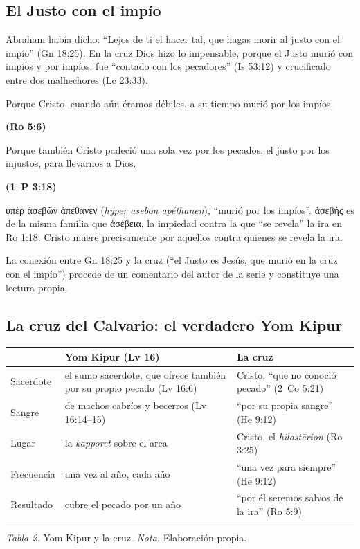 \documentclass[11pt,letterpaper]{article}
\newcommand{\grc}[1]{\foreignlanguage{ancientgreek}{#1}}
\newcommand{\fuente}[1]{\par\hfill{\upshape\bfseries\small\textcolor{azul}{#1}}}
\begin{document}
\subsection{El Justo con el impío}
Abraham había dicho: ``Lejos de ti el hacer tal, que hagas morir al justo con el impío'' (Gn 18:25). En la cruz Dios hizo lo impensable, porque el Justo murió con impíos y por impíos: fue ``contado con los pecadores'' (Is 53:12) y crucificado entre dos malhechores (Lc 23:33).

\begin{cita}Porque Cristo, cuando aún éramos débiles, a su tiempo murió por los impíos.\fuente{(Ro 5:6)}\end{cita}

\begin{cita}Porque también Cristo padeció una sola vez por los pecados, el justo por los injustos, para llevarnos a Dios.\fuente{(1~P 3:18)}\end{cita}

\begin{filologia}[Ro 5:6]
\grc{ὑπὲρ ἀσεβῶν ἀπέθανεν} (\emph{hyper asebōn apéthanen}), ``murió por los impíos''. \grc{ἀσεβής} es de la misma familia que \grc{ἀσέβεια}, la impiedad contra la que ``se revela'' la ira en Ro 1:18. Cristo muere precisamente por aquellos contra quienes se revela la ira.
\end{filologia}

\begin{nota}[Precisión]
La conexión entre Gn 18:25 y la cruz (``el Justo es Jesús, que murió en la cruz con el impío'') procede de un comentario del autor de la serie y constituye una lectura propia.
\end{nota}

\subsection{La cruz del Calvario: el verdadero Yom Kipur}
\begin{center}\small\renewcommand{\arraystretch}{1.3}
\begin{tabular}{@{}L{2.6cm}L{5.6cm}L{6.2cm}@{}}
\toprule
& \textbf{Yom Kipur (Lv 16)} & \textbf{La cruz} \\ \midrule
Sacerdote & el sumo sacerdote, que ofrece también por su propio pecado (Lv 16:6) & Cristo, ``que no conoció pecado'' (2~Co 5:21) \\
Sangre & de machos cabríos y becerros (Lv 16:14--15) & ``por su propia sangre'' (He 9:12) \\
Lugar & la \emph{kapporet} sobre el arca & Cristo, el \emph{hilastērion} (Ro 3:25) \\
Frecuencia & una vez al año, cada año & ``una vez para siempre'' (He 9:12) \\
Resultado & cubre el pecado por un año & ``por él seremos salvos de la ira'' (Ro 5:9) \\
\bottomrule
\end{tabular}\par\smallskip
{\footnotesize\color{gris}\textit{Tabla 2.} Yom Kipur y la cruz. \textit{Nota.} Elaboración propia.}
\end{center}
\end{document}
